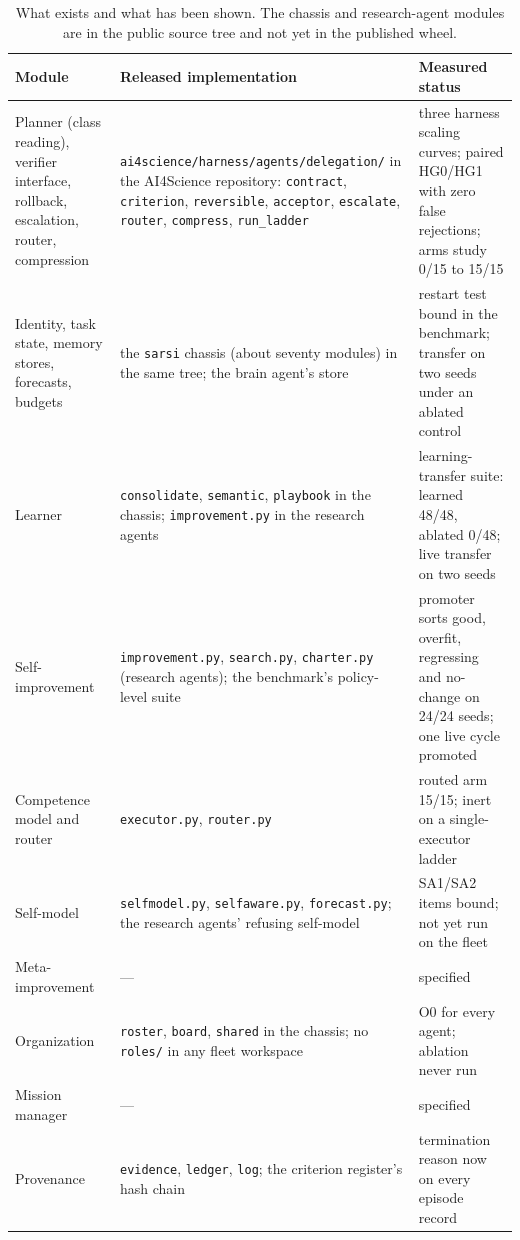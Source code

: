 \documentclass[11pt]{article}
\theoremstyle{definition}
\begin{document}
\begin{table}[!htbp]
\centering\footnotesize
\begin{tabularx}{\textwidth}{@{}lYY@{}}
\toprule
Module & Released implementation & Measured status \\
\midrule
Planner (class reading), verifier interface, rollback, escalation, router, compression & \texttt{ai4science/}\allowbreak\texttt{harness/}\allowbreak\texttt{agents/}\allowbreak\texttt{delegation/} in the AI4Science repository: \texttt{contract}, \texttt{criterion}, \texttt{reversible}, \texttt{acceptor}, \texttt{escalate}, \texttt{router}, \texttt{compress}, \texttt{run\_ladder} & three harness scaling curves; paired HG0/HG1 with zero false rejections; arms study 0/15 to 15/15 \\
Identity, task state, memory stores, forecasts, budgets & the \texttt{sarsi} chassis (about seventy modules) in the same tree; the brain agent's store & restart test bound in the benchmark; transfer on two seeds under an ablated control \\
Learner & \texttt{consolidate}, \texttt{semantic}, \texttt{playbook} in the chassis; \texttt{improvement.py} in the research agents & learning-transfer suite: learned 48/48, ablated 0/48; live transfer on two seeds \\
Self-improvement & \texttt{improvement.py}, \texttt{search.py}, \texttt{charter.py} (research agents); the benchmark's policy-level suite & promoter sorts good, overfit, regressing and no-change on 24/24 seeds; one live cycle promoted \\
Competence model and router & \texttt{executor.py}, \texttt{router.py} & routed arm 15/15; inert on a single-executor ladder \\
Self-model & \texttt{selfmodel.py}, \texttt{selfaware.py}, \texttt{forecast.py}; the research agents' refusing self-model & SA1/SA2 items bound; not yet run on the fleet \\
Meta-improvement & --- & specified \\
Organization & \texttt{roster}, \texttt{board}, \texttt{shared} in the chassis; no \texttt{roles/} in any fleet workspace & O0 for every agent; ablation never run \\
Mission manager & --- & specified \\
Provenance & \texttt{evidence}, \texttt{ledger}, \texttt{log}; the criterion register's hash chain & termination reason now on every episode record \\
\bottomrule
\end{tabularx}
\caption{What exists and what has been shown. The chassis and research-agent modules are in the public source tree and not yet in the published wheel.}
\label{tab:status}
\end{table}
\end{document}
